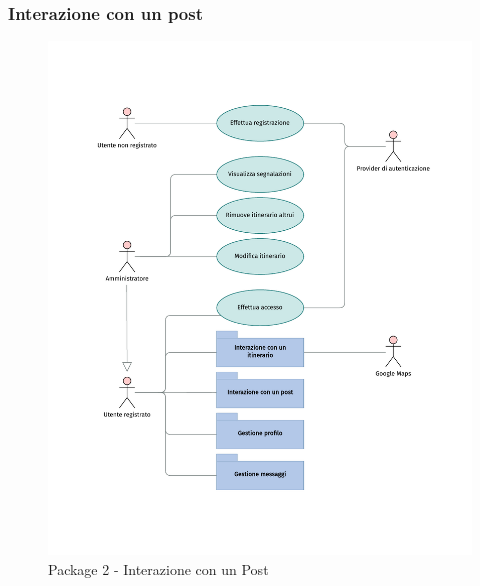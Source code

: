 \documentclass{natourDoc}
\begin{document}
\subsubsection{Interazione con un post}
\begin{figure}[!htbp]
	\centering
	\includegraphics[width=\textwidth, page=4]{./diagrams/useCase.pdf}
	\caption{Package 2 - Interazione con un Post}
\end{figure}
\FloatBarrier

\newpage
\end{document}
